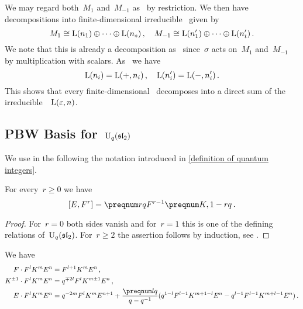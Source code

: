 \documentclass[a4paper, 11pt, oneside]{scrartcl}
\begin{document}
We may regard both~$M_1$ and~$M_{-1}$ as~ by restriction.
We then have decompositions into finite-dimensional irreducible~ given by
\[
  M_1
  \cong
  \operatorname{L}(n_1) \oplus \dotsb \oplus \operatorname{L}(n_s) \,,
  \quad
  M_{-1}
  \cong
  \operatorname{L}(n'_1) \oplus \dotsb \oplus \operatorname{L}(n'_t) \,.
\]
We note that this is already a decomposition as~ since~$\sigma$ acts on~$M_1$ and~$M_{-1}$ by multiplication with scalars.
As~ we have
\[
  \operatorname{L}(n_i) = \operatorname{L}(+, n_i) \,,
  \quad
  \operatorname{L}(n'_i) = \operatorname{L}(-, n'_i) \,.
\]
This shows that every finite-dimensional~ decomposes into a direct sum of the irreducible~~$\operatorname{L}(\varepsilon, n)$.




\subsection{PBW Basis for~$\operatorname{U}_q(\mathfrak{sl}_2)$}
\label{proof of quantum pbw}

We use in the following the notation introduced in \cref{definition of quantum integers}.

\begin{lemma}
  \label{generalized commutator relation for E and F}
  For every~$r \geq 0$ we have
  \[
    [E, F^r]
    =
    \qnum{r} F^{r-1} \qnum{K, 1-r} \,.
  \]
\end{lemma}

\begin{proof}
  For~$r = 0$ both sides vanish and for~$r = 1$ this is one of the defining relations of~$\operatorname{U}_q(\mathfrak{sl}_2)$.
  For~$r \geq 2$ the assertion follows by induction, see \cite[Appendix 1.3~(5)]{jantzen_quantum}.
\end{proof}

\begin{corollary}
  \label{technical formulas}
  We have
  \begin{align*}
    F \cdot F^l K^m E^n
    &=
    F^{l+1} K^m E^n \,,
    \\
    K^{\pm 1} \cdot F^l K^m E^n
    &=
    q^{\mp 2l} F^l K^{m \pm 1} E^n \,,
    \\
    E \cdot F^l K^m E^n
    &=
    q^{-2m} F^l K^m E^{n+1}
    +
    \frac{\qnum{l}}{q - q^{-1}}
    (
      q^{1-l} F^{l-1} K^{m + 1-l} E^n
      -
      q^{l-1} F^{l-1} K^{m + l-1} E^n
    ) \,.
  \end{align*}
\end{corollary}
\end{document}
